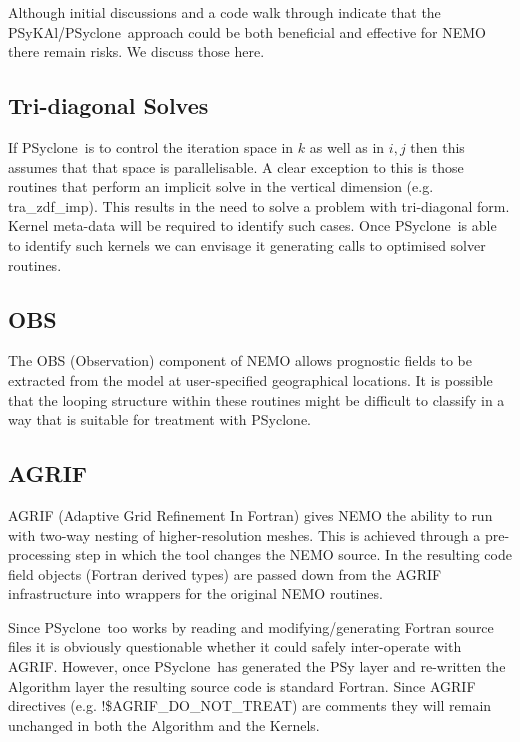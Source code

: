 \documentclass{article}
\newcommand{\psykal}{{PS}y{KA}l}
\newcommand{\psyclone}{{PS}yclone}
\begin{document}
Although initial discussions and a code walk through indicate that the
\psykal/\psyclone\ approach could be both beneficial and effective for
NEMO there remain risks. We discuss those here.

\subsection{Tri-diagonal Solves}

If \psyclone\ is to control the iteration space in $k$ as well as in $i,
j$ then this assumes that that space is parallelisable. A clear
exception to this is those routines that perform an implicit solve in
the vertical dimension (e.g. tra\_zdf\_imp). This results in the need
to solve a problem with tri-diagonal form. Kernel meta-data will be
required to identify such cases. Once \psyclone\ is able to identify
such kernels we can envisage it generating calls to optimised solver
routines.

\subsection{OBS}

The OBS (Observation) component of NEMO allows prognostic fields to be
extracted from the model at user-specified geographical locations.  It
is possible that the looping structure within these routines might be
difficult to classify in a way that is suitable for treatment with
\psyclone.

\subsection{AGRIF}

AGRIF (Adaptive Grid Refinement In Fortran) gives NEMO the ability to
run with two-way nesting of higher-resolution meshes. This is achieved
through a pre-processing step in which the tool changes the NEMO
source. In the resulting code field objects (Fortran derived types)
are passed down from the AGRIF infrastructure into wrappers for the
original NEMO routines.

Since \psyclone\ too works by reading and modifying/generating Fortran
source files it is obviously questionable whether it could safely
inter-operate with AGRIF. However, once \psyclone\ has generated the PSy
layer and re-written the Algorithm layer the resulting source code is
standard Fortran. Since AGRIF directives
(e.g. !\$AGRIF\_DO\_NOT\_TREAT) are comments they will remain unchanged
in both the Algorithm and the Kernels.
\end{document}
